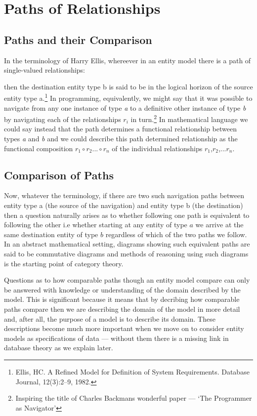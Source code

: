 


\section{Paths of Relationships}
\label{PathsofRelationships}
\subsection{Paths and their Comparison}
\mynote
In the terminology of Harry Ellis, whereever in an entity model there is a path of single-valued relationships:
\begin{center}

\end{center}
then the destination entity type b is said to be in the logical horizon of the source entity type a.\footnote{Ellis, HC. A Refined Model for Definition of System Requirements. Database Journal, 12(3):2--9, 1982.}
In programming, equivalently, we might say that it was possible to navigate from any one instance of type \textit{a} to a definitive other instance of type \textit{b} by navigating each of the relationships $r_i$ in turn.\footnote{Inspiring the title of Charles Backmans wonderful paper --- `The Programmer as Navigator'}
 In mathematical language we could say instead that the path determines a functional relationship between types
\textit{a} and \textit{b} and we could describe this path determined relationship as the functional composition $r_1 \circ r_2 ... \circ r_n$ of the individual relationships $r_1$,$r_2$,...$r_n$.
\subsection{Comparison of Paths}
\mynote
Now, whatever the terminology, if there are two such navigation paths between entity type a (the source
of the navigation) and entity type b (the destination) then a question naturally arises as to whether following one path is equivalent to following the other i.e whether starting at any entity of type $a$ we arrive at the same destination entity of type $b$ regardless of which of the two paths we follow. In an abstract mathematical setting, diagrams showing such equivalent paths are said to be commutative diagrams and methods of reasoning using such diagrams is the starting point of category theory.

\mynote
Questions as to how comparable paths though an entity model compare can only be answered with knowledge or understanding of the domain described by the model. This is significant because it means that by decribing how comparable paths compare then we are describing the domain of the model in more detail and, after all, the purpose of a model is to describe its domain. 
These descriptions become much more important when we move on to consider entity models as specifications of data --- without them there is a missing link in database theory as we explain later. 

